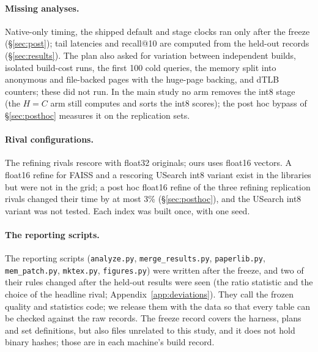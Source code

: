 \paragraph{Missing analyses.} Native-only timing, the shipped default and stage clocks ran only after the
freeze (\S\ref{sec:post}); tail latencies and recall@10 are computed from the held-out records
(\S\ref{sec:results}). The plan also asked for variation between independent builds, isolated build-cost
runs, the first 100 cold queries, the memory split into anonymous and file-backed pages with the
huge-page backing, and dTLB counters; these did not run. In the main study no arm removes the int8 stage (the $H = C$ arm still
computes and sorts the int8 scores); the post hoc bypass of \S\ref{sec:posthoc} measures it on the replication sets.

\paragraph{Rival configurations.} The refining rivals rescore with float32 originals; ours uses float16
vectors. A float16 refine for FAISS and a rescoring USearch int8 variant exist in the libraries but were
not in the grid; a post hoc float16 refine of the three refining replication rivals changed their time by at most 3\%
(\S\ref{sec:posthoc}), and the USearch int8 variant was not tested. Each index was built once, with one seed.

\paragraph{The reporting scripts.} The reporting scripts (\texttt{analyze.py}, \texttt{merge\_results.py},
\texttt{paperlib.py}, \texttt{mem\_patch.py}, \texttt{mktex.py}, \texttt{figures.py}) were written after
the freeze, and two of their rules changed after the held-out results were seen (the ratio statistic
and the choice of the headline rival; Appendix~\ref{app:deviations}). They call the frozen quality and
statistics code; we release them with the data so that every table can be checked against the raw
records. The freeze record covers the harness, plans and set definitions, but also files unrelated to
this study, and it does not hold binary hashes; those are in each machine's build record.
